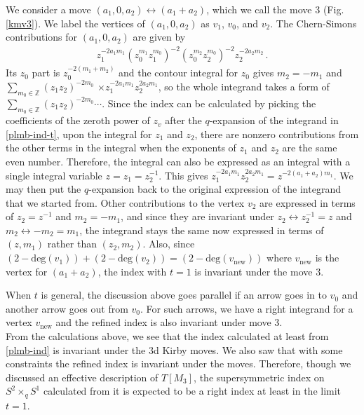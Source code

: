 \documentclass[11pt,hyper,a4paper]{article}
\begin{document}
We consider a move $(a_1,0,a_2) \leftrightarrow (a_1+a_2)$, which we call the move 3 (Fig. \ref{kmv3}).
We label the vertices of $(a_1,0,a_2)$ as $v_1$, $v_0$, and $v_2$.
The Chern-Simons contributions for $(a_1,0,a_2)$ are given by
\begin{align}
z_1^{-2a_1 m_1} (z_0^{m_1} z_1^{m_0})^{-2} (z_0^{m_2} z_2^{m_0})^{-2} z_2^{-2a_2m_2}	\,	.
\end{align}
Its $z_0$ part is $z_0^{-2(m_1+m_2)}$ and the contour integral for $z_0$ gives $m_2=-m_1$ and $\sum_{m_0 \in \mathbb{Z}} (z_1 z_2)^{-2m_0}$ $\times z_1^{-2a_1m_1} z_2^{2a_2m_1}$, so the whole integrand takes a form of $\sum_{m_0 \in \mathbb{Z}} (z_1 z_2)^{-2m_0} \cdots$.
Since the index can be calculated by picking the coefficients of the zeroth power of $z_v$ after the $q$-expansion of the integrand in \eqref{plmb-ind-t}, upon the integral for $z_1$ and $z_2$, there are nonzero contributions from the other terms in the integral when the exponents of $z_1$ and $z_2$ are the same even number.
Therefore, the integral can also be expressed as an integral with a single integral variable $z = z_1=z_2^{-1}$.
This gives $z_1^{-2a_1m_1} z_2^{2a_2m_1} = z^{-2(a_1+a_2)m_1}$.
We may then put the $q$-expansion back to the original expression of the integrand that we started from.
Other contributions to the vertex $v_2$ are expressed in terms of $z_2 = z^{-1}$ and $m_2=-m_1$, and since they are invariant under $z_2 \leftrightarrow z_2^{-1}=z$ and $m_2 \leftrightarrow -m_2=m_1$, the integrand stays the same now expressed in terms of $(z,m_1)$ rather than $(z_2,m_2)$.
Also, since $(2-\text{deg}(v_1))+(2-\text{deg}(v_2))=(2-\text{deg}(v_\text{new}))$ where $v_{\text{new}}$ is the vertex for $(a_1+a_2)$, the index with $t=1$ is invariant under the move 3.


When $t$ is general, the discussion above goes parallel if an arrow goes in to $v_0$ and another arrow goes out from $v_0$.
For such arrows, we have a right integrand for a vertex $v_{\text{new}}$ and the refined index is also invariant under move 3.	\\


From the calculations above, we see that the index calculated at least from \eqref{plmb-ind} is invariant under the 3d Kirby moves.
We also saw that with some constraints the refined index is invariant under the moves.
Therefore, though we discussed an effective description of $T[M_3]$, the supersymmetric index on $S^2 \times_q S^1$ calculated from it is expected to be a right index at least in the limit $t=1$.	\\
\end{document}
